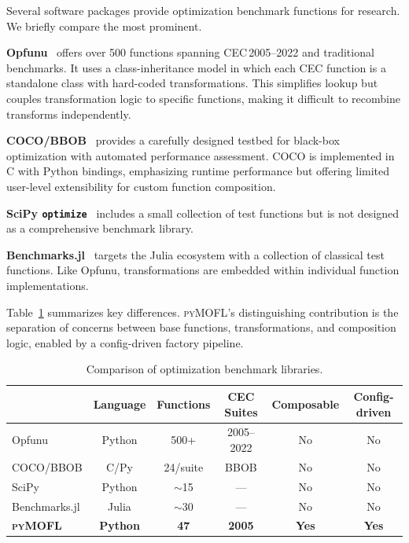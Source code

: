 \documentclass[11pt,a4paper]{article}
\newcommand{\pymofl}{\textsc{pyMOFL}}
\begin{document}
Several software packages provide optimization benchmark functions for
research. We briefly compare the most prominent.

\textbf{Opfunu}~\citep{VanThieu2024} offers over 500 functions spanning
CEC\,2005--2022 and traditional benchmarks. It uses a class-inheritance model
in which each CEC function is a standalone class with hard-coded
transformations. This simplifies lookup but couples transformation logic to
specific functions, making it difficult to recombine transforms independently.

\textbf{COCO/BBOB}~\citep{Hansen2021} provides a carefully designed testbed
for black-box optimization with automated performance assessment. COCO is
implemented in C with Python bindings, emphasizing runtime performance but
offering limited user-level extensibility for custom function composition.

\textbf{SciPy \texttt{optimize}}~\citep{Virtanen2020} includes a small
collection of test functions but is not designed as a comprehensive benchmark
library.

\textbf{Benchmarks.jl}~\citep{benchmarksjl} targets the Julia ecosystem with
a collection of classical test functions. Like Opfunu, transformations are
embedded within individual function implementations.

Table~\ref{tab:comparison} summarizes key differences. \pymofl{}'s
distinguishing contribution is the separation of concerns between base
functions, transformations, and composition logic, enabled by a config-driven
factory pipeline.

\begin{table}[t]
\centering
\caption{Comparison of optimization benchmark libraries.}
\label{tab:comparison}
\begin{tabular}{@{}lccccc@{}}
\toprule
& \textbf{Language} & \textbf{Functions} & \textbf{CEC Suites} & \textbf{Composable} & \textbf{Config-driven} \\
\midrule
Opfunu        & Python & 500+    & 2005--2022 & No  & No  \\
COCO/BBOB     & C/Py   & 24/suite & BBOB       & No  & No  \\
SciPy         & Python & $\sim$15 & ---        & No  & No  \\
Benchmarks.jl & Julia  & $\sim$30 & ---        & No  & No  \\
\textbf{\pymofl{}} & \textbf{Python} & \textbf{47} & \textbf{2005} & \textbf{Yes} & \textbf{Yes} \\
\bottomrule
\end{tabular}
\end{table}
\end{document}
